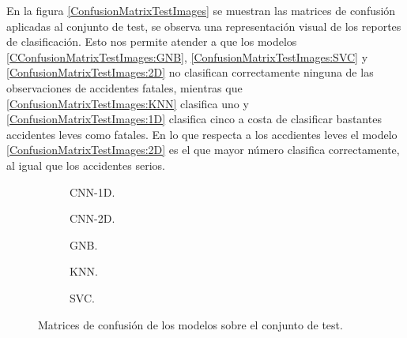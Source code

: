     En la figura \eqref{ConfusionMatrixTestImages} se muestran las matrices de confusión aplicadas al conjunto de test, se observa una representación visual de los reportes de clasificación. Esto nos permite atender a que los modelos  \eqref{CConfusionMatrixTestImages:GNB},  \eqref{ConfusionMatrixTestImages:SVC} y  \eqref{ConfusionMatrixTestImages:2D} no clasifican correctamente ninguna de las observaciones de accidentes fatales, mientras que  \eqref{ConfusionMatrixTestImages:KNN} clasifica uno y  \eqref{ConfusionMatrixTestImages:1D} clasifica cinco a costa de clasificar bastantes accidentes leves como fatales. En lo que respecta a los accdientes leves el modelo  \eqref{ConfusionMatrixTestImages:2D} es el que mayor número clasifica correctamente, al igual que los accidentes serios.

    \begin{figure}[H]
        \centering
        \begin{subfigure}{0.4\textwidth}
            
            \caption{CNN-1D.}
            \label{ConfusionMatrixTestImages:1D}
        \end{subfigure}
        \hspace{3em}
        \begin{subfigure}[b]{0.4\textwidth}
            
            \caption{CNN-2D.} 
            \label{ConfusionMatrixTestImages:2D}
        \end{subfigure}
        \vspace*{0.5 cm}
        \begin{subfigure}[b]{0.4\textwidth}
            
            \caption{GNB.}
            \label{ConfusionMatrixTestImages:GNB}
        \end{subfigure}
        \hspace{3em}
        \begin{subfigure}[b]{0.4\textwidth}
            
            \caption{KNN.}
            \label{ConfusionMatrixTestImages:KNN}
        \end{subfigure}
        \vspace*{0.5 cm}
        \begin{subfigure}[b]{0.4\textwidth}
            
            \caption{SVC.}
            \label{ConfusionMatrixTestImages:SVC}
        \end{subfigure}

        \caption{Matrices de confusión de los modelos sobre el conjunto de test.}
        \label{ConfusionMatrixTestImages}
     \end{figure}

